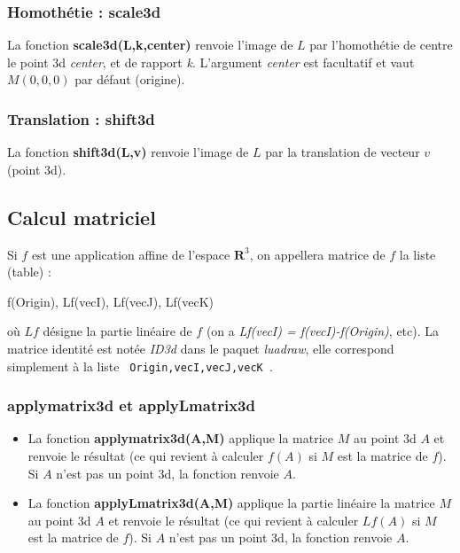 \subsubsection{Homothétie : scale3d}

La fonction \textbf{scale3d(L,k,center)} renvoie l'image de $L$ par l'homothétie de centre le point 3d \emph{center}, et de rapport \emph{k}. L'argument \emph{center} est facultatif et vaut $M(0,0,0)$ par défaut (origine).

\subsubsection{Translation : shift3d}

La fonction \textbf{shift3d(L,v)} renvoie l'image de $L$ par la translation de vecteur $v$ (point 3d).

\subsection{Calcul matriciel}

Si $f$ est une application affine de l'espace $\mathbf R^3$, on appellera matrice de $f$ la liste (table) :
\begin{Luacode}
{ f(Origin), Lf(vecI), Lf(vecJ), Lf(vecK) }
\end{Luacode}
où $Lf$ désigne la partie linéaire de $f$ (on a \emph{Lf(vecI) = f(vecI)-f(Origin)}, etc). La matrice identité est notée \emph{ID3d} dans le paquet \emph{luadraw}, elle correspond simplement à la liste \texttt{ {Origin,vecI,vecJ,vecK} }.

\subsubsection{applymatrix3d et applyLmatrix3d}

\begin{itemize}
    \item La fonction \textbf{applymatrix3d(A,M)} applique la matrice $M$ au point 3d $A$ et renvoie le résultat (ce qui revient à calculer $f(A)$ si $M$ est la matrice de $f$). Si $A$ n'est pas un point 3d, la fonction renvoie $A$.
    
    \item La fonction \textbf{applyLmatrix3d(A,M)} applique la partie linéaire la matrice $M$ au point 3d $A$ et renvoie le résultat (ce qui revient à calculer $Lf(A)$ si $M$ est la matrice de $f$). Si $A$ n'est pas un point 3d, la fonction renvoie $A$.
\end{itemize}

